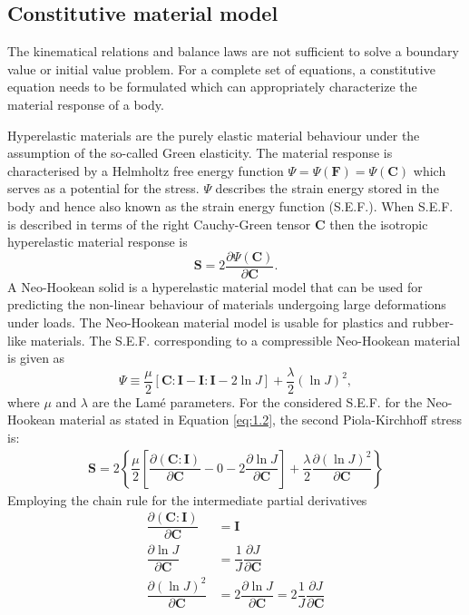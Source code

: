 \documentclass[11pt,a4paper,final]{article}
\begin{document}
\subsection{Constitutive material model}
\label{sec:const_law}
The kinematical relations and balance laws are not sufficient to solve a boundary value or initial value problem. For a complete set of equations, a constitutive equation needs to be formulated which can appropriately characterize the material response of a body. \par 

Hyperelastic materials are the purely elastic material behaviour under the assumption of the so-called Green elasticity. The material response is characterised by a Helmholtz free energy function $\Psi = \Psi(\mathbf{F}) = \Psi(\mathbf{C}) $ which serves as a potential for the stress. $\Psi$ describes the strain energy stored in the body and hence also known as the strain energy function (S.E.F.). When S.E.F. is described in terms of the right Cauchy-Green tensor $\mathbf{C}$ then the isotropic hyperelastic material response is 
\begin{equation}
\mathbf{S} = 2 \dfrac{\partial \Psi (\mathbf{C})}{\partial \mathbf{C}}.
\end{equation}
A Neo-Hookean solid is a hyperelastic material model that can be used for predicting the non-linear behaviour of materials undergoing large deformations under loads. The Neo-Hookean material model is usable for plastics and rubber-like materials. The S.E.F. corresponding to a compressible Neo-Hookean material is given as
\begin{equation}
\Psi \equiv \dfrac{\mu}{2} [\mathbf{C} : \mathbf{I} - \mathbf{I} : \mathbf{I} - 2 \ln J] + \dfrac{\lambda}{2} (\ln J)^2,
\label{eq:1.2}
\end{equation}
where $\mu$ and $\lambda$ are the Lam\'e parameters. For the considered S.E.F. for the Neo-Hookean material as stated in Equation \eqref{eq:1.2}, the second Piola-Kirchhoff stress is:
\begin{align}
\mathbf{S} = 2 \left\{ \dfrac{\mu}{2} \left[\dfrac{\partial (\mathbf{C} : \mathbf{I})}{\partial \mathbf{C}} - 0 - 2 \dfrac{\partial \ln J}{\partial \mathbf{C}}\right] + \dfrac{\lambda}{2} \dfrac{\partial (\ln J)^2}{\partial \mathbf{C}} \right\}
\end{align}
Employing the chain rule for the intermediate partial derivatives
\begin{align}
\dfrac{\partial (\mathbf{C} : \mathbf{I})}{\partial \mathbf{C}} &= \mathbf{I} \label{eq:1.4.1} \\ 
\dfrac{\partial \ln J}{\partial \mathbf{C}} &= \dfrac{1}{J} \dfrac{\partial J}{\partial \mathbf{C}} \label{eq:1.4.2} \\ 
\dfrac{\partial (\ln J)^2}{\partial \mathbf{C}} &= 2 \dfrac{\partial \ln J}{\partial \mathbf{C}} = 2 \dfrac{1}{J} \dfrac{\partial J}{\partial \mathbf{C}}
\label{eq:1.4.3}
\end{align}
\end{document}

